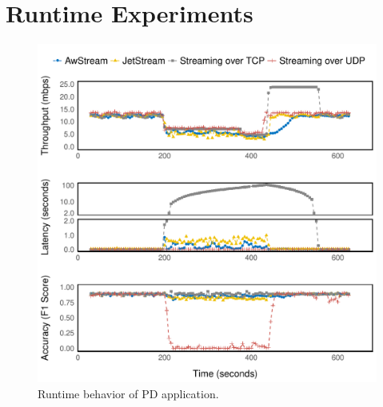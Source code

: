 \section{Runtime Experiments}
\label{appendix:more-runtime}

\begin{figure}
  \centering
  \includegraphics[width=\columnwidth]{figures/runtime-mot-verticle.pdf}
  \caption{Runtime behavior of PD application.}
  \label{fig:pd-runtime}
\end{figure}

